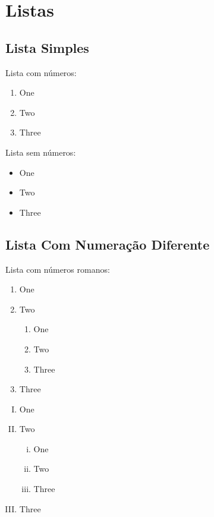
\section{Listas}
\subsection{Lista Simples}

Lista com números:

\begin{enumerate}
  \item One
  \item Two
  \item Three
\end{enumerate}

Lista sem números:

\begin{itemize}
  \item One
  \item Two
  \item Three
\end{itemize}

\subsection{Lista Com Numeração Diferente}

Lista com números romanos:

\begin{enumerate}[I]
  \item One
  \item Two
        \begin{enumerate}[i]
          \item One
          \item Two
          \item Three
        \end{enumerate}
  \item Three
\end{enumerate}

\begin{enumerate}[(I)]
  \item One
  \item Two
        \begin{enumerate}[(i)]
          \item One
          \item Two
          \item Three
        \end{enumerate}
  \item Three
\end{enumerate}%


